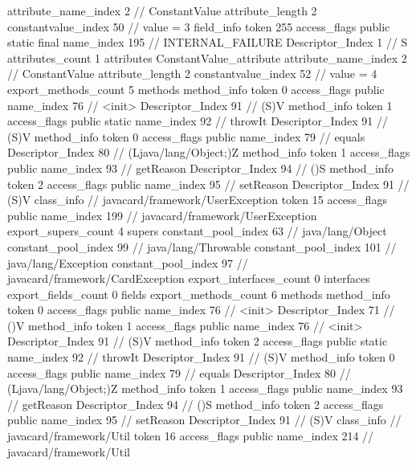 {{{{{{{					attribute_name_index	2		// ConstantValue
					attribute_length	2
					constantvalue_index	50		// value = 3
				}
				}
			}
			field_info {
				token	255
				access_flags	public static final
				name_index	195		// INTERNAL_FAILURE
				Descriptor_Index	1		// S
				attributes_count	1
				attributes {
				ConstantValue_attribute {
					attribute_name_index	2		// ConstantValue
					attribute_length	2
					constantvalue_index	52		// value = 4
				}
				}
			}
			}
			export_methods_count	5
			methods {
				method_info {
					token	0
					access_flags	public
					name_index	76		// <init>
					Descriptor_Index	91		// (S)V
				}
				method_info {
					token	1
					access_flags	public static
					name_index	92		// throwIt
					Descriptor_Index	91		// (S)V
				}
				method_info {
					token	0
					access_flags	public
					name_index	79		// equals
					Descriptor_Index	80		// (Ljava/lang/Object;)Z
				}
				method_info {
					token	1
					access_flags	public
					name_index	93		// getReason
					Descriptor_Index	94		// ()S
				}
				method_info {
					token	2
					access_flags	public
					name_index	95		// setReason
					Descriptor_Index	91		// (S)V
				}
			}
		}
		class_info {		// javacard/framework/UserException
			token	15
			access_flags	public
			name_index	199		// javacard/framework/UserException
			export_supers_count	4
			supers {
				constant_pool_index	63		// java/lang/Object
				constant_pool_index	99		// java/lang/Throwable
				constant_pool_index	101		// java/lang/Exception
				constant_pool_index	97		// javacard/framework/CardException
			}
			export_interfaces_count	0
			interfaces {
			}
			export_fields_count	0
			fields {
			}
			export_methods_count	6
			methods {
				method_info {
					token	0
					access_flags	public
					name_index	76		// <init>
					Descriptor_Index	71		// ()V
				}
				method_info {
					token	1
					access_flags	public
					name_index	76		// <init>
					Descriptor_Index	91		// (S)V
				}
				method_info {
					token	2
					access_flags	public static
					name_index	92		// throwIt
					Descriptor_Index	91		// (S)V
				}
				method_info {
					token	0
					access_flags	public
					name_index	79		// equals
					Descriptor_Index	80		// (Ljava/lang/Object;)Z
				}
				method_info {
					token	1
					access_flags	public
					name_index	93		// getReason
					Descriptor_Index	94		// ()S
				}
				method_info {
					token	2
					access_flags	public
					name_index	95		// setReason
					Descriptor_Index	91		// (S)V
				}
			}
		}
		class_info {		// javacard/framework/Util
			token	16
			access_flags	public
			name_index	214		// javacard/framework/Util
}}}
